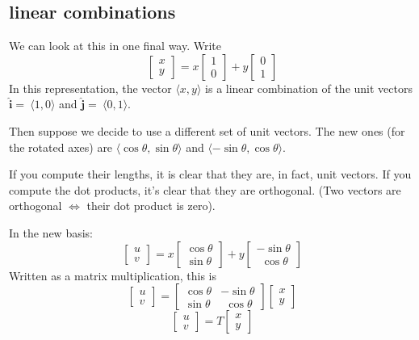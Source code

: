 \documentclass[11pt, oneside]{article}
\begin{document}
\subsection*{linear combinations}
We can look at this in one final way.  Write
\[
\begin{bmatrix}  x \\ y \end{bmatrix}
=
x
\begin{bmatrix}  1 \\ 0 \end{bmatrix}
+
y
\begin{bmatrix}  0 \\ 1 \end{bmatrix}
\]
In this representation, the vector $\langle x,y \rangle$ is a linear combination of the unit vectors $\mathbf{\hat{i}} =\ \langle 1,0 \rangle$ and $\mathbf{\hat{j}}  =\ \langle 0,1 \rangle$.

Then suppose we decide to use a different set of unit vectors.  The new ones (for the rotated axes) are $\langle \cos \theta,\sin \theta \rangle$ and $\langle -\sin \theta,\cos \theta \rangle$.  

If you compute their lengths, it is clear that they are, in fact, unit vectors.  If you compute the dot products, it's clear that they are orthogonal.  (Two vectors are orthogonal $\iff$ their dot product is zero).

In the new basis:
\[
\begin{bmatrix} 
u \\ 
v 
\end{bmatrix}
=
x
\begin{bmatrix}  \cos \theta \\ \sin \theta \end{bmatrix}
+
y
\begin{bmatrix}  -\sin \theta \\ \ \ \cos \theta \end{bmatrix}
\]
Written as a matrix multiplication, this is
\[
\begin{bmatrix}  u \\ v\end{bmatrix}
=
\begin{bmatrix}  
\cos \theta & -\sin \theta \\
\sin \theta & \ \  \cos \theta 
\end{bmatrix}
\begin{bmatrix}  x \\ y \end{bmatrix}
\]
\[ \begin{bmatrix}  u \\ v\end{bmatrix}
=
T 
\begin{bmatrix}  x \\ y \end{bmatrix}
\]
\end{document}
